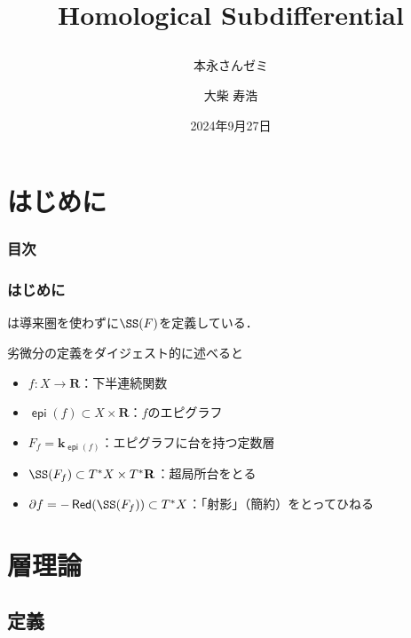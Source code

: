 \documentclass[dvipdfmx,12pt,aspectratio=169,leqno]{beamer}%
\title{Homological Subdifferential
\subtitle{本永さんゼミ}}
\date{2024年9月27日}
\author{大柴 寿浩}
\newcommand{\rr}{\mathbf{R}}
\newcommand{\kk}{\mathbf{k}}
\newcommand{\p}{\partial}
\numberwithin{equation}{subsection}
\newcommand{\Red}{\mathop{\mathsf{Red}}\nolimits}
\newcommand{\epi}{\mathop{\mathsf{epi}}\nolimits}
\theoremstyle{mystyle}
\begin{document}
\begin{frame}
    \titlepage
\end{frame}
\begin{comment}
    \begin{frame}\frametitle{書くこと}
    \begin{itemize}
        \item 特に興味を持った定理や理論の背景
        \item それを記述するための記号や概念の導入
        \item 正確な主張の紹介
        \item 証明の基本的なアイデアやアウトラインの紹介
        \item または定理の過程を満たす具体例や定理の応用例の紹介
    \end{itemize}
    \end{frame}
\end{comment}
\section*{はじめに}
\begin{frame}
    \frametitle{目次}
    \tableofcontents
\end{frame}

\begin{frame}
    \frametitle{はじめに}
    \cite{Ike24}は導来圏を使わずに\(\SS(F)\)を定義している．

    \bigskip
    劣微分の定義をダイジェスト的に述べると
    \begin{itemize}
        \item \(f\colon X\to \rr\)：下半連続関数
        \item \(\epi(f)\subset X\times \rr\)：\(f\)のエピグラフ
        \item \(F_{f}=\kk_{\epi(f)}\)：エピグラフに台を持つ定数層
        \item \(\SS(F_{f})\subset T^{\ast}X\times T^{\ast}\rr\)：超局所台をとる
        \item \(\p f = -\Red(\SS(F_{f}))\subset T^{\ast}X\)：「射影」（簡約）をとってひねる
    \end{itemize}
\end{frame}
\section[層]{層理論}
\subsection{定義}
\end{document}
